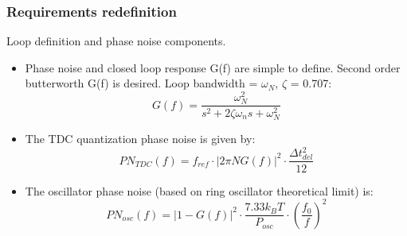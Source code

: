 \documentclass[t, screen, aspectratio=43]{beamer}
\begin{document}
\begin{frame}
	\frametitle{Requirements redefinition}
	\begin{block}{Loop definition and phase noise components.}
		\begin{minipage}{7cm}
			\vspace{1em}
			\begin{itemize}
				\scriptsize
				\item Phase noise and closed loop response G(f) are simple to define. Second order butterworth G(f) is desired. Loop bandwidth = $\omega_N$, $\zeta$ = 0.707:
				\tiny
				\begin{equation}
					G(f) = \frac{\omega_N^2}{s^2 + 2\zeta\omega_n s + \omega_N^2}
				\end{equation}
				\scriptsize
				\item The TDC quantization phase noise is given by: 
				\tiny
				\begin{equation}
					PN_{TDC}(f) = f_{ref}\cdot|2\pi NG(f)|^2\cdot \frac{\Delta t_{del}^2}{12}
				\end{equation}
				\scriptsize	
				\item The oscillator phase noise (based on ring oscillator theoretical limit) is: 
				\tiny
				\begin{equation}
					PN_{osc}(f) = |1-G(f)|^2\cdot  \frac{7.33 k_B T}{P_{osc}}\cdot\left(\frac{f_0}{f}\right)^2
				\end{equation}
				\scriptsize	
			\end{itemize}  


\end{minipage}
\end{block}
\end{frame}
\end{document}
